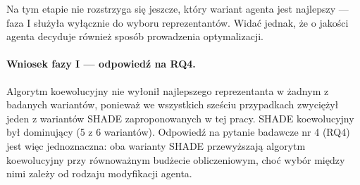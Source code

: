 Na tym etapie nie rozstrzyga się jeszcze, który wariant agenta jest najlepszy --- faza I służyła wyłącznie do wyboru reprezentantów. Widać jednak, że o jakości agenta decyduje również sposób prowadzenia optymalizacji.

\paragraph{Wniosek fazy I --- odpowiedź na RQ4.}
Algorytm koewolucyjny nie wyłonił najlepszego reprezentanta w żadnym z badanych wariantów, ponieważ we wszystkich sześciu przypadkach zwyciężył jeden z wariantów SHADE zaproponowanych w tej pracy. SHADE koewolucyjny był dominujący (5 z 6 wariantów). Odpowiedź na pytanie badawcze nr 4 (RQ4) jest więc jednoznaczna: oba warianty SHADE przewyższają algorytm koewolucyjny przy równoważnym budżecie obliczeniowym, choć wybór między nimi zależy od rodzaju modyfikacji agenta.
